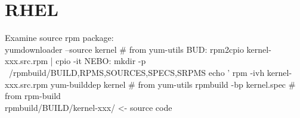 
\chapter{RHEL}
Examine source rpm package:
\\
yumdownloader --source kernel # from yum-utils
BUD: rpm2cpio kernel-xxx.src.rpm | cpio -it
NEBO:  mkdir -p ~/rpmbuild/{BUILD,RPMS,SOURCES,SPECS,SRPMS}
echo '%
rpm -ivh kernel-xxx.src.rpm
yum-builddep kernel # from yum-utils
rpmbuild -bp kernel.spec # from rpm-build
\\
rpmbuild/BUILD/kernel-xxx/ <- source code

